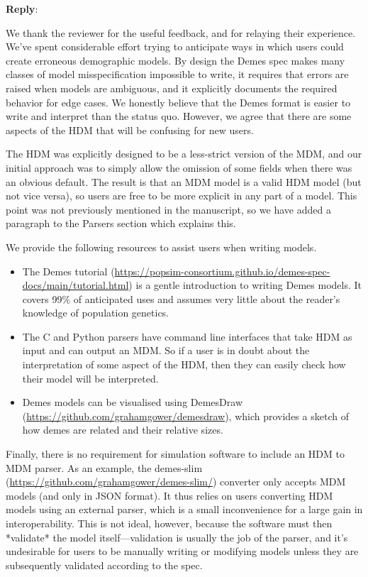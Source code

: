 \documentclass[11pt]{article}
\newcounter{reviewer}
\newcounter{point}[reviewer]
\newenvironment{reply}
   {\medskip \noindent \begin{sf}\textbf{Reply}:\  }
   {\medskip \end{sf}}
\begin{document}
\begin{reply}

We thank the reviewer for the useful feedback, and for relaying their
experience.
We've spent considerable effort trying to anticipate ways in which users
could create erroneous demographic models. By design the Demes spec
makes many classes of model misspecification impossible to write,
it requires that errors are raised when models are ambiguous,
and it explicitly documents the required behavior for edge cases.
We honestly believe that the Demes format is easier to write
and interpret than the status quo.
However, we agree that there are some aspects of the HDM that will be
confusing for new users.

The HDM was explicitly designed to be a less-strict version of the MDM,
and our initial approach was to simply allow the omission of some fields
when there was an obvious default.
The result is that an MDM model is a valid HDM model (but not vice versa),
so users are free to be more explicit in any part of a model.
This point was not previously mentioned in the manuscript, so we have
added a paragraph to the Parsers section which explains this.

We provide the following resources to assist users when writing models.
\begin{itemize}
\item
The Demes tutorial
(\url{https://popsim-consortium.github.io/demes-spec-docs/main/tutorial.html})
is a gentle introduction to writing Demes models.
It covers 99\% of anticipated uses and assumes very little about the
reader's knowledge of population genetics.
\item
The C and Python parsers have command line interfaces that take HDM as
input and can output an MDM.
So if a user is in doubt about the interpretation of some aspect of the HDM,
then they can easily check how their model will be interpreted.
\item
Demes models can be visualised using DemesDraw
(\url{https://github.com/grahamgower/demesdraw}),
which provides a sketch of how demes are related and their relative sizes.
\end{itemize}

Finally, there is no requirement for simulation software to include
an HDM to MDM parser. As an example, the demes-slim
(\url{https://github.com/grahamgower/demes-slim/})
converter only accepts MDM models (and only in JSON format).
It thus relies on users converting HDM models using an
external parser, which is a small inconvenience for a large gain
in interoperability.
This is not ideal, however, because the software must then
*validate* the model itself---validation is usually the job of the parser,
and it's undesirable for users to be manually writing or modifying models
unless they are subsequently validated according to the spec.

\end{reply}
\end{document}
